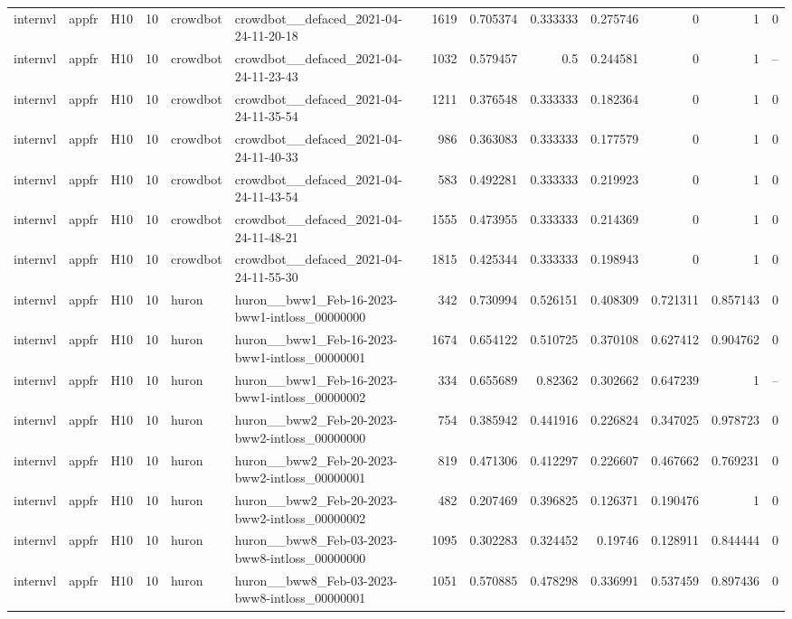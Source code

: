 \begin{longtable}{lllrllrrrrrrr}
internvl & appfr & H10 & 10 & crowdbot & crowdbot\_\_defaced\_2021-04-24-11-20-18 & 1619 & 0.705374 & 0.333333 & 0.275746 & 0 & 1 & 0 \\
internvl & appfr & H10 & 10 & crowdbot & crowdbot\_\_defaced\_2021-04-24-11-23-43 & 1032 & 0.579457 & 0.5 & 0.244581 & 0 & 1 & -- \\
internvl & appfr & H10 & 10 & crowdbot & crowdbot\_\_defaced\_2021-04-24-11-35-54 & 1211 & 0.376548 & 0.333333 & 0.182364 & 0 & 1 & 0 \\
internvl & appfr & H10 & 10 & crowdbot & crowdbot\_\_defaced\_2021-04-24-11-40-33 & 986 & 0.363083 & 0.333333 & 0.177579 & 0 & 1 & 0 \\
internvl & appfr & H10 & 10 & crowdbot & crowdbot\_\_defaced\_2021-04-24-11-43-54 & 583 & 0.492281 & 0.333333 & 0.219923 & 0 & 1 & 0 \\
internvl & appfr & H10 & 10 & crowdbot & crowdbot\_\_defaced\_2021-04-24-11-48-21 & 1555 & 0.473955 & 0.333333 & 0.214369 & 0 & 1 & 0 \\
internvl & appfr & H10 & 10 & crowdbot & crowdbot\_\_defaced\_2021-04-24-11-55-30 & 1815 & 0.425344 & 0.333333 & 0.198943 & 0 & 1 & 0 \\
internvl & appfr & H10 & 10 & huron & huron\_\_bww1\_Feb-16-2023-bww1-intloss\_00000000 & 342 & 0.730994 & 0.526151 & 0.408309 & 0.721311 & 0.857143 & 0 \\
internvl & appfr & H10 & 10 & huron & huron\_\_bww1\_Feb-16-2023-bww1-intloss\_00000001 & 1674 & 0.654122 & 0.510725 & 0.370108 & 0.627412 & 0.904762 & 0 \\
internvl & appfr & H10 & 10 & huron & huron\_\_bww1\_Feb-16-2023-bww1-intloss\_00000002 & 334 & 0.655689 & 0.82362 & 0.302662 & 0.647239 & 1 & -- \\
internvl & appfr & H10 & 10 & huron & huron\_\_bww2\_Feb-20-2023-bww2-intloss\_00000000 & 754 & 0.385942 & 0.441916 & 0.226824 & 0.347025 & 0.978723 & 0 \\
internvl & appfr & H10 & 10 & huron & huron\_\_bww2\_Feb-20-2023-bww2-intloss\_00000001 & 819 & 0.471306 & 0.412297 & 0.226607 & 0.467662 & 0.769231 & 0 \\
internvl & appfr & H10 & 10 & huron & huron\_\_bww2\_Feb-20-2023-bww2-intloss\_00000002 & 482 & 0.207469 & 0.396825 & 0.126371 & 0.190476 & 1 & 0 \\
internvl & appfr & H10 & 10 & huron & huron\_\_bww8\_Feb-03-2023-bww8-intloss\_00000000 & 1095 & 0.302283 & 0.324452 & 0.19746 & 0.128911 & 0.844444 & 0 \\
internvl & appfr & H10 & 10 & huron & huron\_\_bww8\_Feb-03-2023-bww8-intloss\_00000001 & 1051 & 0.570885 & 0.478298 & 0.336991 & 0.537459 & 0.897436 & 0 \\

\end{longtable}

